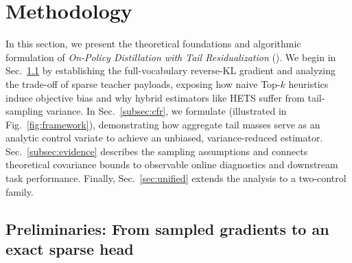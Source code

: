 \section{Methodology}
\label{sec:event}

In this section, we present the theoretical foundations and algorithmic formulation of \textit{{O}n-{P}olicy {D}istillation with Tail {Res}idualization} (\method{}). 
We begin in Sec.~\ref{subsec:prelim} by establishing the full-vocabulary reverse-KL gradient and analyzing the trade-off of sparse teacher payloads, exposing how naive Top-$k$ heuristics induce objective bias and why hybrid estimators like HETS suffer from tail-sampling variance. 
In Sec.~\ref{subsec:cfr}, we formulate \method{} (illustrated in Fig.~\ref{fig:framework}), demonstrating how aggregate tail masses serve as an analytic control variate to achieve an unbiased, variance-reduced estimator. 
Sec.~\ref{subsec:evidence} describes the sampling assumptions and
connects theoretical covariance bounds to observable online diagnostics and downstream task performance.
Finally, Sec.~\ref{sec:unified} extends the analysis to a two-control family.



\subsection{Preliminaries: From sampled gradients to an exact sparse head}
\label{subsec:prelim}

